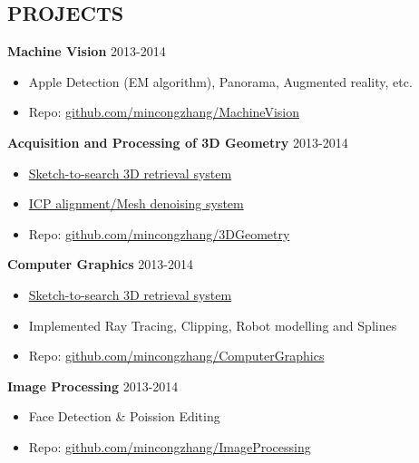 \documentclass[line,margin]{res}
\begin{document}
\begin{resume}
\section{PROJECTS}
{\bf Machine Vision}
\hfill{\textcolor[rgb]{0.7,0.7,0.7}{2013-2014}}
\begin{itemize}\itemsep -2pt %
    \item Apple Detection (EM algorithm), Panorama, Augmented reality, etc.
    \item Repo: \href{https://github.com/mincongzhang/MachineVision}{github.com/mincongzhang/MachineVision}
\end{itemize}

{\bf Acquisition and Processing of 3D Geometry}
\hfill{\textcolor[rgb]{0.7,0.7,0.7}{2013-2014}}
\begin{itemize}\itemsep -2pt %
    \item \href{https://github.com/mincongzhang/3D_Retrieval_sketch2search}{Sketch-to-search 3D retrieval system}
    \item \href{https://github.com/mincongzhang/PlayWithOpenMesh}{ICP alignment/Mesh denoising system}
    \item Repo: \href{https://github.com/mincongzhang/3DGeometry}{github.com/mincongzhang/3DGeometry}
\end{itemize}

{\bf Computer Graphics}
\hfill{\textcolor[rgb]{0.7,0.7,0.7}{2013-2014}}
\begin{itemize}\itemsep -2pt %
    \item \href{https://github.com/mincongzhang/3D_Retrieval_sketch2search}{Sketch-to-search 3D retrieval system}
    \item Implemented Ray Tracing, Clipping, Robot modelling and Splines
    \item Repo: \href{https://github.com/mincongzhang/ComputerGraphics}{github.com/mincongzhang/ComputerGraphics}
\end{itemize}

{\bf Image Processing}
\hfill{\textcolor[rgb]{0.7,0.7,0.7}{2013-2014}}
\begin{itemize}\itemsep -2pt %
    \item Face Detection \& Poission Editing
    \item Repo: \href{https://github.com/mincongzhang/ImageProcessing/tree/master/PostGrad}{github.com/mincongzhang/ImageProcessing}
\end{itemize}


\end{resume}
\end{document}
